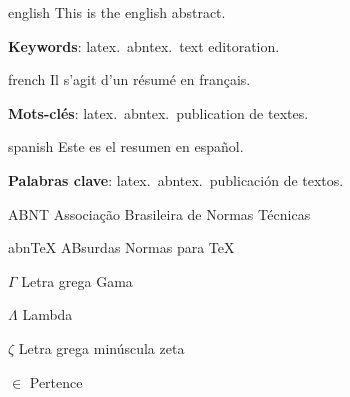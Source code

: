 \begin{resumo}[Abstract]
\begin{otherlanguage*}{english}
This is the english abstract.

\vspace{\onelineskip}

\noindent
\textbf{Keywords}: latex.\ abntex.\ text editoration.
\end{otherlanguage*}
\end{resumo}

\begin{resumo}[Résumé]
\begin{otherlanguage*}{french}
    Il s'agit d'un résumé en français.

\textbf{Mots-clés}: latex.\ abntex.\ publication de textes.
\end{otherlanguage*}
\end{resumo}

\begin{resumo}[Resumen]
\begin{otherlanguage*}{spanish}
Este es el resumen en español.

\textbf{Palabras clave}: latex.\ abntex.\ publicación de textos.
\end{otherlanguage*}
\end{resumo}

\listoffigures*
\cleardoublepage{}

\listofquadros*
\cleardoublepage{}

\listoftables*
\cleardoublepage{}

\begin{siglas}
  \item[ABNT] Associação Brasileira de Normas Técnicas
  \item[abnTeX] ABsurdas Normas para TeX
\end{siglas}

\begin{simbolos}
  \item[$ \Gamma $] Letra grega Gama
  \item[$ \Lambda $] Lambda
  \item[$ \zeta $] Letra grega minúscula zeta
  \item[$ \in $] Pertence
\end{simbolos}

\tableofcontents*
\cleardoublepage{}
